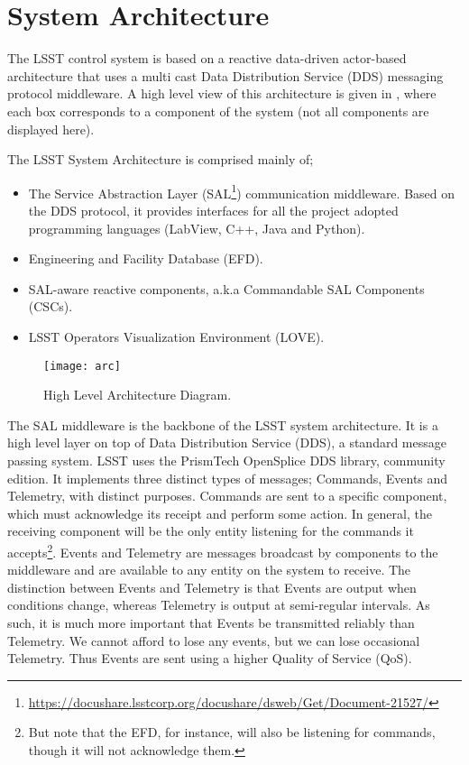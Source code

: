 \section{System Architecture} \label{sec:sysarc}


The LSST control system is based on a reactive data-driven actor-based architecture that uses a multi cast Data Distribution Service 
(DDS) messaging protocol middleware. A high level view of this architecture is given in , where each box corresponds to a 
component of the system (not all components are displayed here).

The LSST System Architecture is comprised mainly of;
%
\begin{itemize}
\item The Service Abstraction Layer (SAL\footnote{\url{https://docushare.lsstcorp.org/docushare/dsweb/Get/Document-21527/}}) communication middleware. Based on the DDS protocol, it provides interfaces for all the project adopted programming languages (LabView, C++, Java and Python).
\item Engineering and Facility Database (EFD).
\item SAL-aware reactive components, a.k.a Commandable SAL Components (CSCs).
\item LSST Operators Visualization Environment (LOVE).
\end{itemize}

\begin{figure}
\begin{center}
\texttt{[image: arc]}
\caption{High Level Architecture Diagram.\label{fig:arc}}
\end{center}
\end{figure}

The SAL middleware is the backbone of the LSST system architecture. It is a high level layer on top of Data 
Distribution Service (DDS), a standard message passing system. LSST uses the PrismTech OpenSplice DDS library, 
community edition. It implements three distinct types of messages; Commands, Events and Telemetry, with distinct 
purposes. Commands are sent to a specific component, which must acknowledge its receipt and perform some action. 
In general, the receiving component will be the only entity listening for the commands it accepts\footnote{But note that the EFD, for instance, will also be listening for 
commands, though it will not acknowledge them.}. Events and Telemetry are messages broadcast by components to the 
middleware and are available to any entity on the system to receive. The distinction between Events and Telemetry is that 
Events are output when conditions change, whereas Telemetry is output at semi-regular intervals. As such, it is much more 
important that Events be transmitted reliably than Telemetry. We cannot afford to lose any events, but we can lose occasional 
Telemetry. Thus Events are sent using a higher Quality of Service (QoS).

